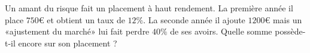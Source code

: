 
\begin{exercice}\label{exosmath-0559}

    Un amant du risque fait un placement à haut rendement. La première année il place \( 750\)€ et obtient un taux de \( 12\%\). La seconde année il ajoute \( 1200\)€ mais un «ajustement du marché» lui fait perdre \( 40\%\) de ses avoirs. Quelle somme possède-t-il encore sur son placement ?

\end{exercice}
